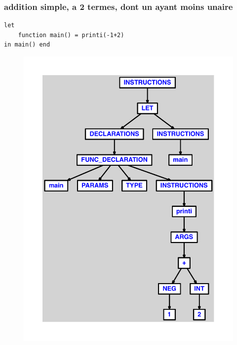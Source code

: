 \documentclass{article}
\begin{document}
\subsubsection{addition simple, a 2 termes, dont un ayant moins unaire}
\begin{lstlisting}
let
	function main() = printi(-1+2)
in main() end
\end{lstlisting}
\newpage
\begin{figure}[H]
\centering
\includegraphics[max width=\textwidth]{ast/ast_63.pdf}
\end{figure}
\newpage
\end{document}

